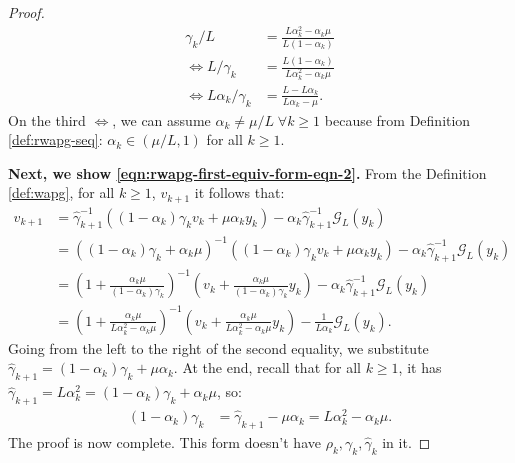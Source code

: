 \documentclass[12pt]{article}
\begin{document}
\begin{proof}
\begin{align*}
                \gamma_k/L
                &=
                \frac{L \alpha_k^2 - \alpha_k\mu}{L (1 - \alpha_k)}
                \\
                \iff
                L/\gamma_k
                &=
                \frac{L (1 - \alpha_k)}{L \alpha_k^2 - \alpha_k\mu}
                \\
                \iff
                L\alpha_k/\gamma_k
                &=
                \frac{L - L\alpha_k}{L\alpha_k - \mu}.
            \end{align*}
            On the third $\iff$, we can assume $\alpha_k \neq \mu/L\;  \forall k \ge 1$ because from Definition \ref{def:rwapg-seq}: $\alpha_k \in (\mu/L, 1)$ for all $k \ge 1$.
            \par
            \textbf{Next, we show \eqref{eqn:rwapg-first-equiv-form-eqn-2}.}
            From the Definition \ref{def:wapg}, for all $k \ge 1$, $v_{k + 1}$ it follows that:
            \begin{align*}
                v_{k + 1} &=
                \hat \gamma_{k + 1}^{-1}
                ((1 - \alpha_k)\gamma_k v_k + \mu\alpha_k y_k)
                - \alpha_k\hat \gamma_{k + 1}^{-1}\mathcal G_L (y_k)
                \\
                &=
                ((1 - \alpha_k)\gamma_k + \alpha_k \mu)^{-1}
                \left(
                    (1 - \alpha_k)\gamma_k v_k + \mu\alpha_k y_k
                \right)
                - \alpha_k\hat \gamma_{k + 1}^{-1}\mathcal G_L (y_k)
                \\
                &=
                \left(
                    1 + \frac{\alpha_k\mu}{(1 - \alpha_k)\gamma_k}
                \right)^{-1}
                \left(
                    v_k +
                    \frac{\alpha_k\mu}{(1 - \alpha_k)\gamma_k} y_k
                \right)
                - \alpha_k\hat \gamma_{k + 1}^{-1}\mathcal G_L (y_k)
                \\
                &=
                \left(
                    1 + \frac{\alpha_k \mu}{L \alpha_k^2 - \alpha_k \mu}
                \right)^{-1}
                \left(
                    v_k +
                    \frac{\alpha_k \mu}{L \alpha_k^2 - \alpha_k \mu} y_k
                \right)
                - \frac{1}{L\alpha_{k}}\mathcal G_L (y_k).
            \end{align*}
            Going from the left to the right of the second equality, we substitute $\hat \gamma_{k + 1} = (1 - \alpha_k)\gamma_k + \mu\alpha_k$.
            At the end, recall that for all $k \ge 1$, it has $\hat \gamma_{k + 1} = L \alpha_k^2 = (1 - \alpha_k)\gamma_k + \alpha_k \mu$, so:
            \begin{align*}
                (1 - \alpha_k)\gamma_k
                &=
                \hat \gamma_{k + 1} - \mu \alpha_k
                =
                L\alpha_{k}^2 - \alpha_k\mu.
            \end{align*}
            The proof is now complete.
            This form doesn't have $\rho_k, \gamma_k, \hat \gamma_k$ in it.
        \end{proof}
\end{document}
